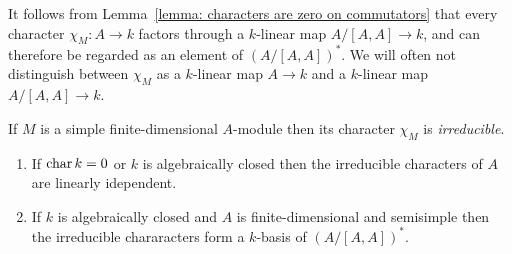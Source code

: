 \begin{fluff}
  It follows from Lemma~\ref{lemma: characters are zero on commutators} that every character $\chi_M \colon A \to k$ factors through a $k$-linear map $A/[A,A] \to k$, and can therefore be regarded as an element of $(A/[A,A])^*$.
  We will often not distinguish between $\chi_M$ as a $k$-linear map $A \to k$ and a $k$-linear map $A/[A,A] \to k$.
\end{fluff}


\begin{definition}
  If $M$ is a simple finite-dimensional $A$-module then its character $\chi_M$ is \emph{irreducible}.
\end{definition}


\begin{theorem}
  \leavevmode
  \label{theorem: characters as a basis}
  \begin{enumerate}
    \item
      \label{enumerate: characters are linearly independent}
      If $\operatorname{char} k = 0$ or $k$ is algebraically closed then the irreducible characters of $A$ are linearly idependent.
    \item
      If $k$ is algebraically closed and $A$ is finite-dimensional and semisimple then the irreducible chararacters form a $k$-basis of $(A/[A,A])^*$.
  \end{enumerate}
\end{theorem}


